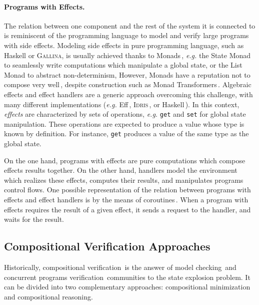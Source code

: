 \paragraph{Programs with Effects.}
%
The relation between one component and the rest of the system it is connected to
is reminiscent of the programming language to model and verify large programs
with side effects.
%
Modeling side effects in pure programming language, such as Haskell or {\scshape
  Gallina}, is usually achieved thanks to
Monads\,\cite{wadler1990comprehending,jones2005io}, \emph{e.g.} the State Monad
to seamlessly write computations which manipulate a global state, or the List
Monad to abstract non-determinism,
%
However, Monads have a reputation not to compose very
well\,\cite{hyland2006combining}, despite construction such as Monad
Transformers\,\cite{liang1995mtl}.
%
Algebraic effects and effect handlers are a generic approach overcoming this
challenge, with many different implementations (\emph{e.g.}
Eff\,\cite{bauer2015effects}, {\scshape Idris}\,\cite{brady2013idris}, or
Haskell\,\cite{kiselyov2013extensible}).
%
In this context, \emph{effects} are characterized by sets of operations,
\emph{e.g.} \texttt{get} and \texttt{set} for global state manipulation.
%
These operations are expected to produce a value whose type is known by
definition.
%
For instance, \texttt{get} produces a value of the same type as the global
state.

On the one hand, programs with effects are pure computations which compose
effects results together.
%
On the other hand, handlers model the environment which realizes these effects,
computes their results, and manipulates programs control flows.
%
One possible representation of the relation between programs with effects and
effect handlers is by the means of coroutines\,\cite{kiselyov2013extensible}.
%
When a program with effects requires the result of a given effect, it sends a
request to the handler, and waits for the result.

\subsection{Compositional Verification Approaches}
\label{subsec:sota:compverif}

Historically, compositional verification\,\cite{peng1998survey} is the answer of
model checking\,\cite{mcmillan1989compositional} and concurrent programs
verification\,\cite{jones1983tentative} communities to the state explosion
problem.
%
It can be divided into two complementary approaches: compositional minimization
and compositional reasoning.

